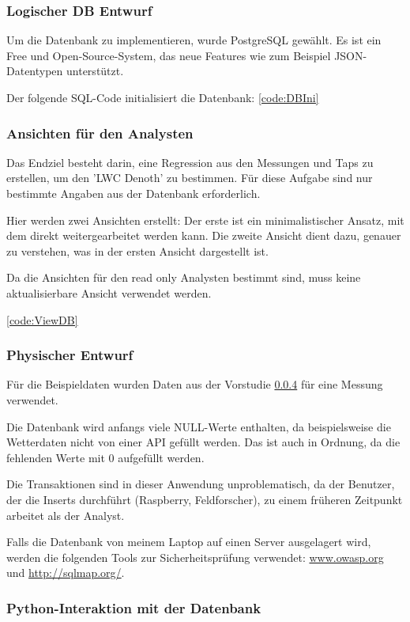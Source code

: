 \subsubsection{Logischer DB Entwurf}

Um die Datenbank zu implementieren, wurde PostgreSQL gewählt. Es ist ein Free und Open-Source-System, das neue Features wie zum Beispiel JSON-Datentypen unterstützt.

Der folgende SQL-Code initialisiert die Datenbank: \ref{code:DBIni}

\subsubsection{Ansichten für den Analysten}
Das Endziel besteht darin, eine Regression aus den Messungen und Taps zu erstellen, um den 'LWC Denoth' zu bestimmen. Für diese Aufgabe sind nur bestimmte Angaben aus der Datenbank erforderlich.

Hier werden zwei Ansichten erstellt: Der erste ist ein minimalistischer Ansatz, mit dem direkt weitergearbeitet werden kann. Die zweite Ansicht dient dazu, genauer zu verstehen, was in der ersten Ansicht dargestellt ist.

Da die Ansichten für den read only Analysten bestimmt sind, muss keine aktualisierbare Ansicht verwendet werden.

\ref{code:ViewDB}

\subsubsection{Physischer Entwurf}
Für die Beispieldaten wurden Daten aus der Vorstudie \ref{} für eine Messung verwendet.

Die Datenbank wird anfangs viele NULL-Werte enthalten, da beispielsweise die Wetterdaten nicht von einer API gefüllt werden. Das ist auch in Ordnung, da die fehlenden Werte mit 0 aufgefüllt werden.

Die Transaktionen sind in dieser Anwendung unproblematisch, da der Benutzer, der die Inserts durchführt (Raspberry, Feldforscher), zu einem früheren Zeitpunkt arbeitet als der Analyst.

Falls die Datenbank von meinem Laptop auf einen Server ausgelagert wird, werden die folgenden Tools zur Sicherheitsprüfung verwendet: \href{https://www.owasp.org}{www.owasp.org} und \href{http://sqlmap.org/}{http://sqlmap.org/}.

\subsubsection{Python-Interaktion mit der Datenbank}


